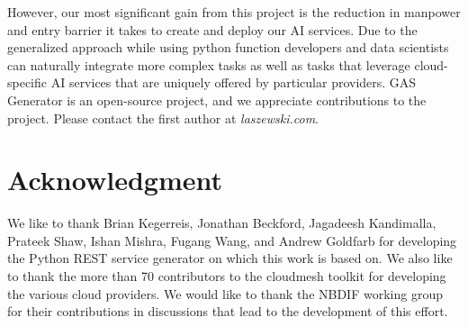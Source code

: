 However, our most significant gain from this project is the reduction in manpower and entry barrier it takes to create and deploy our AI services. Due to the generalized approach while using python function developers and data scientists can naturally integrate more complex tasks as well as tasks that leverage cloud-specific AI services that are uniquely offered by particular providers. GAS Generator is an open-source project, and we appreciate contributions to the project. Please contact the first author at  \textit{laszewski\@gmail.com}.


\section*{Acknowledgment}

We like to thank
Brian Kegerreis,
Jonathan Beckford,
Jagadeesh Kandimalla,
Prateek Shaw,
Ishan Mishra,
Fugang Wang, and Andrew Goldfarb for developing the Python REST service generator on which this work is based on. We also like to thank the more than 70 contributors to the cloudmesh toolkit for developing the various cloud providers. We would like to thank the NBDIF working group for their contributions in discussions that lead to the development of this effort.



